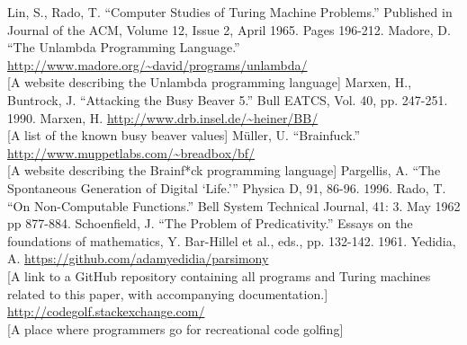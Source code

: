 \documentclass[11pt]{article}
\begin{document}
\begin{thebibliography}{100}
 Lin, S., Rado, T. ``Computer Studies of Turing Machine Problems.'' Published in Journal of the ACM, Volume 12, Issue 2, April 1965. Pages 196-212.
 Madore, D. ``The Unlambda Programming Language.'' \url{http://www.madore.org/~david/programs/unlambda/} \\
{[A website describing the Unlambda programming language]}
 Marxen, H., Buntrock, J. ``Attacking the Busy Beaver 5.'' Bull EATCS, Vol. 40, pp. 247-251. 1990.
 Marxen, H. 
\url{http://www.drb.insel.de/~heiner/BB/} \\ 
{[A list of the known busy beaver values]}
 M\"uller, U. ``Brainfuck.'' \url{http://www.muppetlabs.com/~breadbox/bf/} \\
{[A website describing the Brainf*ck programming language]}
 Pargellis, A. ``The Spontaneous Generation of Digital {`Life.'}'' Physica D, 91, 86-96. 1996.
 Rado, T. ``On Non-Computable Functions.'' Bell System Technical Journal, 41: 3. May 1962 pp 877-884.
 Schoenfield, J. ``The Problem of Predicativity.'' Essays on the foundations of mathematics, Y. Bar-Hillel et al., eds., pp. 132-142. 1961.
 Yedidia, A. \url{https://github.com/adamyedidia/parsimony} \\
{[A link to a GitHub repository containing all programs and Turing machines related to this paper, with accompanying documentation.]}
 \url{http://codegolf.stackexchange.com/} \\
{[A place where programmers go for recreational code golfing]}
\end{thebibliography}
\end{document}
